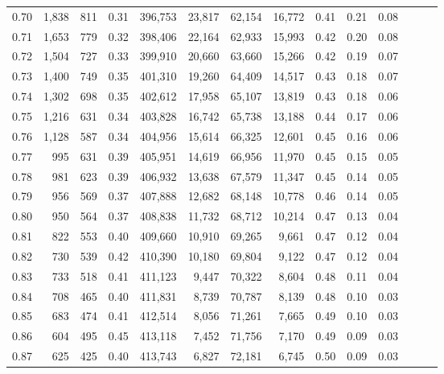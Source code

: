 \begin{tabular}{rrrrrrrrrrrrrr}
0.70 &   1,838 &    811 &  0.31 &  396,753 &   23,817 &  62,154 &  16,772 &  0.41 &  0.21 &      0.08 \\
0.71 &   1,653 &    779 &  0.32 &  398,406 &   22,164 &  62,933 &  15,993 &  0.42 &  0.20 &      0.08 \\
0.72 &   1,504 &    727 &  0.33 &  399,910 &   20,660 &  63,660 &  15,266 &  0.42 &  0.19 &      0.07 \\
0.73 &   1,400 &    749 &  0.35 &  401,310 &   19,260 &  64,409 &  14,517 &  0.43 &  0.18 &      0.07 \\
0.74 &   1,302 &    698 &  0.35 &  402,612 &   17,958 &  65,107 &  13,819 &  0.43 &  0.18 &      0.06 \\
0.75 &   1,216 &    631 &  0.34 &  403,828 &   16,742 &  65,738 &  13,188 &  0.44 &  0.17 &      0.06 \\
0.76 &   1,128 &    587 &  0.34 &  404,956 &   15,614 &  66,325 &  12,601 &  0.45 &  0.16 &      0.06 \\
0.77 &     995 &    631 &  0.39 &  405,951 &   14,619 &  66,956 &  11,970 &  0.45 &  0.15 &      0.05 \\
0.78 &     981 &    623 &  0.39 &  406,932 &   13,638 &  67,579 &  11,347 &  0.45 &  0.14 &      0.05 \\
0.79 &     956 &    569 &  0.37 &  407,888 &   12,682 &  68,148 &  10,778 &  0.46 &  0.14 &      0.05 \\
0.80 &     950 &    564 &  0.37 &  408,838 &   11,732 &  68,712 &  10,214 &  0.47 &  0.13 &      0.04 \\
0.81 &     822 &    553 &  0.40 &  409,660 &   10,910 &  69,265 &   9,661 &  0.47 &  0.12 &      0.04 \\
0.82 &     730 &    539 &  0.42 &  410,390 &   10,180 &  69,804 &   9,122 &  0.47 &  0.12 &      0.04 \\
0.83 &     733 &    518 &  0.41 &  411,123 &    9,447 &  70,322 &   8,604 &  0.48 &  0.11 &      0.04 \\
0.84 &     708 &    465 &  0.40 &  411,831 &    8,739 &  70,787 &   8,139 &  0.48 &  0.10 &      0.03 \\
0.85 &     683 &    474 &  0.41 &  412,514 &    8,056 &  71,261 &   7,665 &  0.49 &  0.10 &      0.03 \\
0.86 &     604 &    495 &  0.45 &  413,118 &    7,452 &  71,756 &   7,170 &  0.49 &  0.09 &      0.03 \\
0.87 &     625 &    425 &  0.40 &  413,743 &    6,827 &  72,181 &   6,745 &  0.50 &  0.09 &      0.03 \\

\end{tabular}
